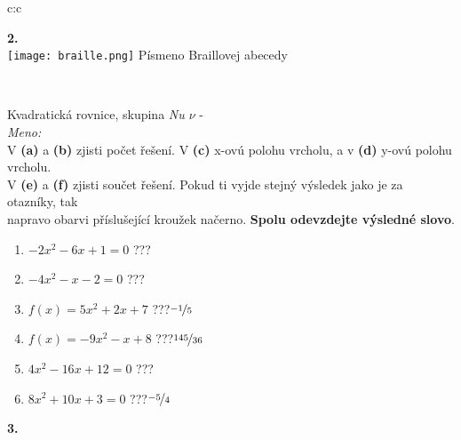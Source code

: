\documentclass[10pt]{report}
\begin{document}
\begin{tabular}{c:c}
\begin{minipage}[c][99mm][t]{0.49\linewidth}
\begin{center}
\begin{minipage}{0.20\linewidth}
\begin{center}
{\Huge\bfseries 2.} \\[2mm]
\texttt{[image: braille.png]}
{\small Písmeno Braillovej abecedy}
\end{center}
\end{minipage}
\end{center}
\end{minipage}
\\ \hdashline
\begin{minipage}[c][99mm][t]{0.49\linewidth}
\begin{center}
\vspace{7mm}
{\huge Kvadratická rovnice, skupina \textit{Nu $\nu$} -}\\[4.5mm]
\textit{Meno:}\phantom{xxxxxxxxxxxxxxxxxxxxxxxxxxxxxxxxxxxxxxxxxxxxxxxxxxxxxxxxxxxxxxxxx}\\[3.5mm]
V \textbf{(a)} a \textbf{(b)} zjisti počet řešení. V \textbf{(c)} x-ovú polohu vrcholu, a v \textbf{(d)} y-ovú polohu vrcholu.\\V \textbf{(e)} a \textbf{(f)} zjisti součet řešení. Pokud ti vyjde stejný výsledek jako je za otazníky, tak\\napravo obarvi příslušející kroužek načerno. \textbf{Spolu odevzdejte výsledné slovo}.\\[3mm]
\begin{minipage}{0.77\linewidth}
\begin{center}
\begin{varwidth}{\textwidth}
\begin{enumerate}
\large
\item $-2x^2-6x+1=0$\quad \dotfill\; ???\;\dotfill {}
\item $-4x^2-x-2=0$\quad \dotfill\; ???\;\dotfill {}
\item $f(x)=5x^2+2x+7$\quad \dotfill\; ???\;\dotfill \quad $\nicefrac{-1}{5}$
\item $f(x)=-9x^2-x+8$\quad \dotfill\; ???\;\dotfill \quad $\nicefrac{145}{36}$
\item $4x^2-16x+12=0$\quad \dotfill\; ???\;\dotfill {}
\item $8x^2+10x+3=0$\quad \dotfill\; ???\;\dotfill \quad $\nicefrac{-5}{4}$
\end{enumerate}
\end{varwidth}
\end{center}
\end{minipage}
\begin{minipage}{0.20\linewidth}
\begin{center}
{\Huge\bfseries 3.} \\[2mm]

\end{center}
\end{minipage}
\end{center}
\end{minipage}
\end{tabular}
\end{document}
